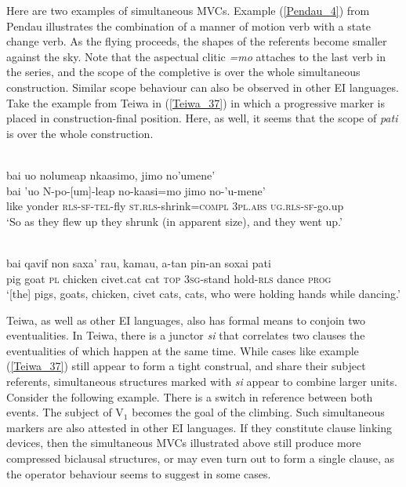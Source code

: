 Here are two examples of simultaneous MVCs. Example (\ref{Pendau_4}) from Pendau illustrates the combination of a manner of motion verb with a state change verb. As the flying proceeds, the shapes of the referents become smaller against the sky. Note that the aspectual clitic \textit{=mo} attaches to the last verb in the series, and the scope of the completive is over the whole simultaneous construction. Similar scope behaviour can also be observed in other EI languages. Take the example from Teiwa in (\ref{Teiwa_37}) in which a progressive marker is placed in construction-final position. Here, as well, it seems that the scope of \textit{pati} is over the whole construction. 

\ea \label{Pendau_4}
\\
\glll bai uo nolumeap nkaasimo, jimo no'umene' \\
bai 'uo N-po-[um]-leap no-kaasi=mo jimo no-'u-mene' \\
like yonder \textsc{rls}-\textsc{sf}-\textsc{tel}-fly \textsc{st}.\textsc{rls}-shrink=\textsc{compl} 3\textsc{pl}.\textsc{abs} \textsc{ug}.\textsc{rls}-\textsc{sf}-go.up \\
\glft `So as they flew up they shrunk (in apparent size), and they went up.'\\ 
\z

\ea \label{Teiwa_37}
\\
\gll bai qavif non saxa' rau, kamau, a-tan pin-an soxai pati \\
pig goat \textsc{pl} chicken civet.cat cat \textsc{top} 3\textsc{sg}-stand hold-\textsc{rls} dance \textsc{prog} \\
\glft `[the] pigs, goats, chicken, civet cats, cats, who were holding hands while dancing.'\\ 
\z

Teiwa, as well as other EI languages, also has formal means to conjoin two eventualities. In Teiwa, there is a junctor \textit{si} that correlates two clauses the eventualities of which happen at the same time. While cases like example (\ref{Teiwa_37}) still appear to form a tight construal, and share their subject referents, simultaneous structures marked with \textit{si} appear to combine larger units. Consider the following example. There is a switch in reference between both events. The subject of V$_1$ becomes the goal of the climbing. Such simultaneous markers are also attested in other EI languages. If they constitute clause linking devices, then the simultaneous MVCs illustrated above still produce more compressed biclausal structures, or may even turn out to form a single clause, as the operator behaviour seems to suggest in some cases.

